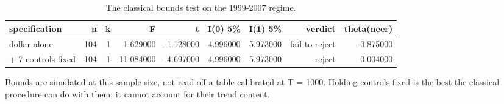 \begin{table}[htbp]
\centering
\caption{The classical bounds test on the 1999-2007 regime.}
\label{tab:tab04_classical}
\begin{threeparttable}
\begin{tabular}{lrrrrrrrr}
\toprule
specification & n & k & F & t & I(0) 5\% & I(1) 5\% & verdict & theta(neer) \\
\midrule
dollar alone & 104 & 1 & 1.629000 & -1.128000 & 4.996000 & 5.973000 & fail to reject & -0.875000 \\
+ 7 controls fixed & 104 & 1 & 11.084000 & -4.697000 & 4.996000 & 5.973000 & reject & 0.004000 \\
\bottomrule
\end{tabular}

\begin{tablenotes}[flushleft]\small
\item Bounds are simulated at this sample size, not read off a table calibrated at T = 1000. Holding controls fixed is the best the classical procedure can do with them; it cannot account for their trend content.
\end{tablenotes}
\end{threeparttable}
\end{table}